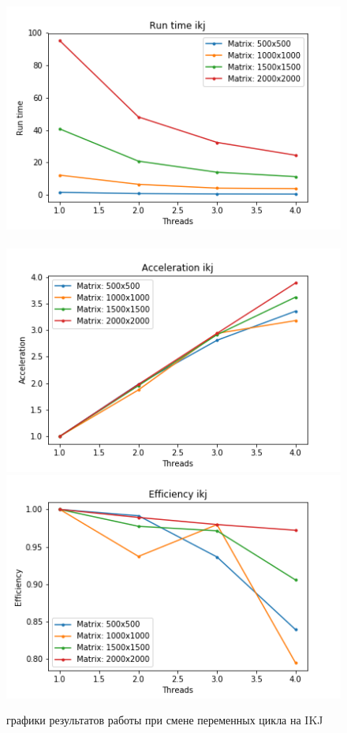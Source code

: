 \documentclass[12pt]{article}
\begin{document}
\begin{figure}
		\includegraphics[scale=0.4]{ikj/ikj_Runtime.png}~
		\includegraphics[scale=0.4]{ikj/ikj_Acceleration.png}
		\includegraphics[scale=0.4]{ikj/ikj_Efficiency.png}
		\caption{графики результатов работы при смене переменных цикла на IKJ}
	\end{figure}
	
\newpage
\end{document}

